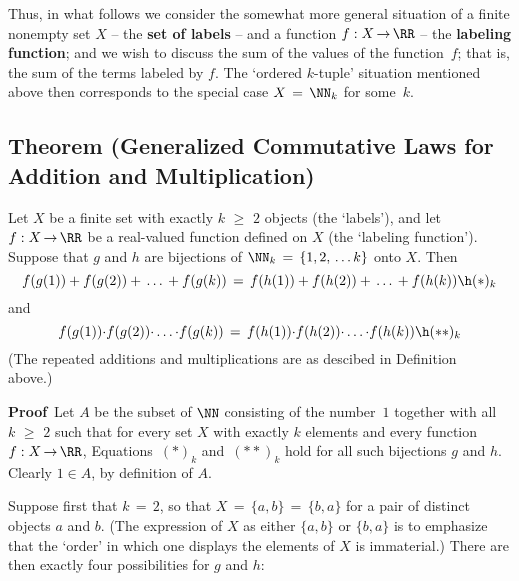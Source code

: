 {    Thus, in what follows we consider the somewhat more general situation of a finite nonempty set $X$ -- the {\bf set of labels} -- and a function $f:X \,{\rightarrow}\, {\RR}$ -- the {\bf labeling function};
    and we wish to discuss the sum of the values of the function~$f$; that is, the sum of the terms labeled by $f$.
    The `ordered $k$-tuple' situation mentioned above then corresponds to the special case $X \,=\, {\NN}_{k}$ for some~$k$.

\V
\V

            \subsection{\small{\bf Theorem} (Generalized Commutative Laws for Addition and Multiplication)}
            \label{ThmB10.40}

        Let $X$ be a finite set with exactly $k\,\,{\geq}\,\,2$ objects (the `labels'),
    and let $f:X \,{\rightarrow}\, {\RR}$ be a real-valued function defined on $X$ (the `labeling function').
    Suppose that $g$ and $h$ are bijections of ${\NN}_{k} \,=\, \{1,2,\,{\ldots}\,k\}$ onto $X$.
    Then
        \begin{displaymath}
        f(g(1)) + f(g(2)) + \,{\ldots}\,+ f(g(k)) \,=\, 
        f(h(1)) + f(h(2)) + \,{\ldots}\,+ f(h(k)) \h ({\ast})_{k}
        \end{displaymath}
    and
        \begin{displaymath}
        f(g(1)) {\cdot} f(g(2)) {\cdot} \,{\ldots}\,{\cdot} f(g(k)) \,=\, 
        f(h(1)) {\cdot} f(h(2)) {\cdot} \,{\ldots}\,{\cdot} f(h(k)) \h ({\ast}{\ast})_{k}
        \end{displaymath}
    (The repeated additions and multiplications are as descibed in Definition~ above.)

\V

        {\bf Proof}\, Let $A$ be the subset of ${\NN}$ consisting of the number~$1$ together with all $k\,\,{\geq}\,\,2$ such that for every set $X$ with exactly $k$ elements and every function $f:X \,{\rightarrow}\, {\RR}$, Equations~$({\ast})_{k}$ and~$({\ast}{\ast})_{k}$ hold for all such bijections $g$ and $h$.
    Clearly $1{\in}A$, by definition of $A$.

        Suppose first that $k \,=\, 2$, so that $X \,=\, \{a,b\} \,=\, \{b,a\}$ for a pair of distinct objects $a$ and $b$.
    (The expression of $X$ as either $\{a,b\}$ or $\{b,a\}$ is to emphasize that the `order' in which one displays the elements of $X$ is immaterial.)
    There are then exactly four possibilities for $g$ and $h$:

}
